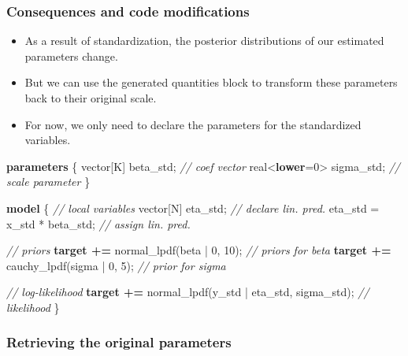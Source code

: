 \documentclass[
  11pt,
]{article}
\newenvironment{Shaded}{\begin{snugshade}}{\end{snugshade}}
\newcommand{\CommentTok}[1]{\textcolor[rgb]{0.56,0.35,0.01}{\textit{#1}}}
\newcommand{\DataTypeTok}[1]{\textcolor[rgb]{0.13,0.29,0.53}{#1}}
\newcommand{\DecValTok}[1]{\textcolor[rgb]{0.00,0.00,0.81}{#1}}
\newcommand{\KeywordTok}[1]{\textcolor[rgb]{0.13,0.29,0.53}{\textbf{#1}}}
\newcommand{\NormalTok}[1]{#1}
\providecommand{\tightlist}{%
  \setlength{\itemsep}{0pt}\setlength{\parskip}{0pt}}
\begin{document}
\hypertarget{consequences-and-code-modifications}{%
\subsubsection{Consequences and code modifications}\label{consequences-and-code-modifications}}

\begin{itemize}
\tightlist
\item
  As a result of standardization, the posterior distributions of our estimated parameters change.
\item
  But we can use the generated quantities block to transform these parameters back to their original scale.
\item
  For now, we only need to declare the parameters for the standardized variables.
\end{itemize}

\begin{Shaded}
\begin{Highlighting}[]
\KeywordTok{parameters}\NormalTok{ \{}
  \DataTypeTok{vector}\NormalTok{[K] beta\_std;      }\CommentTok{// coef vector}
  \DataTypeTok{real}\NormalTok{\textless{}}\KeywordTok{lower}\NormalTok{=}\DecValTok{0}\NormalTok{\textgreater{} sigma\_std; }\CommentTok{// scale parameter}
\NormalTok{\}}

\KeywordTok{model}\NormalTok{ \{}
  \CommentTok{// local variables}
  \DataTypeTok{vector}\NormalTok{[N] eta\_std;          }\CommentTok{// declare lin. pred.}
\NormalTok{  eta\_std = x\_std * beta\_std; }\CommentTok{// assign lin. pred.}

  \CommentTok{// priors}
  \KeywordTok{target +=}\NormalTok{ normal\_lpdf(beta | }\DecValTok{0}\NormalTok{, }\DecValTok{10}\NormalTok{);  }\CommentTok{// priors for beta}
  \KeywordTok{target +=}\NormalTok{ cauchy\_lpdf(sigma | }\DecValTok{0}\NormalTok{, }\DecValTok{5}\NormalTok{);  }\CommentTok{// prior for sigma}
  
  \CommentTok{// log{-}likelihood}
  \KeywordTok{target +=}\NormalTok{ normal\_lpdf(y\_std | eta\_std, sigma\_std); }\CommentTok{// likelihood}
\NormalTok{\}}
\end{Highlighting}
\end{Shaded}

\hypertarget{retrieving-the-original-parameters}{%
\subsubsection{Retrieving the original parameters}\label{retrieving-the-original-parameters}}
\end{document}
